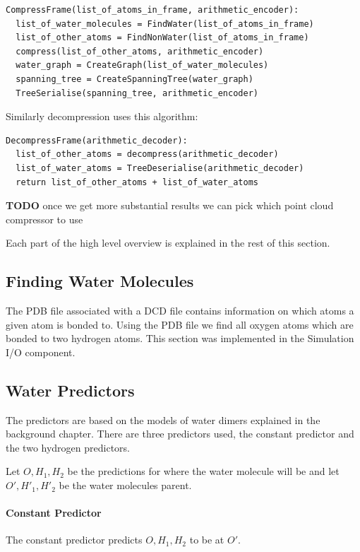 \documentclass{report}
\newcommand{\todo}{\textbf{TODO} }
\begin{document}
\begin{verbatim}
CompressFrame(list_of_atoms_in_frame, arithmetic_encoder):
  list_of_water_molecules = FindWater(list_of_atoms_in_frame)
  list_of_other_atoms = FindNonWater(list_of_atoms_in_frame)
  compress(list_of_other_atoms, arithmetic_encoder)
  water_graph = CreateGraph(list_of_water_molecules)
  spanning_tree = CreateSpanningTree(water_graph)
  TreeSerialise(spanning_tree, arithmetic_encoder)
\end{verbatim}

\noindent Similarly decompression uses this algorithm:

\begin{verbatim}
DecompressFrame(arithmetic_decoder):
  list_of_other_atoms = decompress(arithmetic_decoder)
  list_of_water_atoms = TreeDeserialise(arithmetic_decoder)
  return list_of_other_atoms + list_of_water_atoms
\end{verbatim}

\todo once we get more substantial results we can pick which point cloud compressor to use

Each part of the high level overview is explained in the rest of this section.


\subsection{Finding Water Molecules}

The PDB file associated with a DCD file contains information on which atoms a
given atom is bonded to. Using the PDB file we find all oxygen atoms which are
bonded to two hydrogen atoms. This section was implemented in the Simulation
I/O component.


\subsection{Water Predictors}

The predictors are based on the models of water dimers explained in the
background chapter. There are three predictors used, the constant predictor
and the two hydrogen predictors.

Let $O, H_1, H_2$ be the predictions for where the water molecule will be and
let $O', H'_1, H'_2$ be the water molecules parent.

\paragraph{Constant Predictor}
The constant predictor predicts $O, H_1, H_2$ to be at $O'$.
\end{document}

